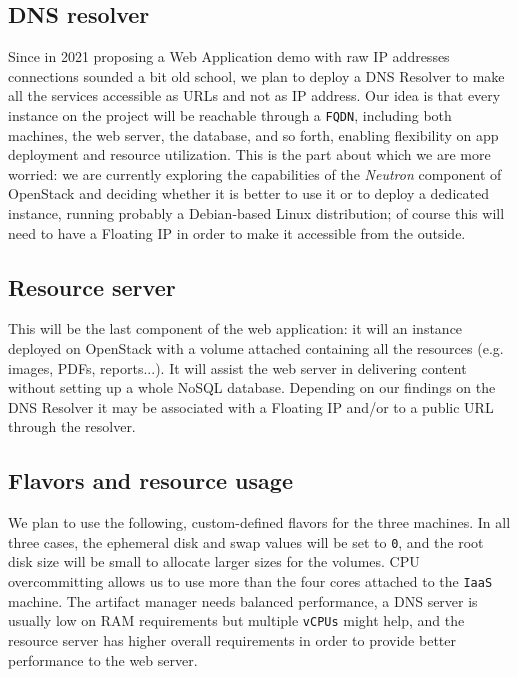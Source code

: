 \subsection{DNS resolver}
Since in 2021 proposing a Web Application demo with raw IP addresses connections sounded a bit old school, we plan to deploy a DNS Resolver to make all the services accessible as URLs and not as IP address. Our idea is that every instance on the project will be reachable through a \verb=FQDN=, including both machines, the web server, the database, and so forth, enabling flexibility on app deployment and resource utilization.%
\newline
This is the part about which we are more worried: we are currently exploring the capabilities of the \textit{Neutron} component of OpenStack and deciding whether it is better to use it or to deploy a dedicated instance, running probably a Debian-based Linux distribution; of course this will need to have a Floating IP in order to make it accessible from the outside.

\subsection{Resource server}
This will be the last component of the web application: it will an instance deployed on OpenStack with a volume attached containing all the resources (e.g. images, PDFs, reports...). It will assist the web server in delivering content without setting up a whole NoSQL database. Depending on our findings on the DNS Resolver it may be associated with a Floating IP and/or to a public URL through the resolver.

\subsection{Flavors and resource usage}
We plan to use the following, custom-defined flavors for the three machines. In all three cases, the ephemeral disk and swap values will be set to \verb=0=, and the root disk size will be small to allocate larger sizes for the volumes. CPU overcommitting allows us to use more than the four cores attached to the \verb=IaaS= machine. The artifact manager needs balanced performance, a DNS server is usually low on RAM requirements but multiple \verb=vCPUs= might help, and the resource server has higher overall requirements in order to provide better performance to the web server.

